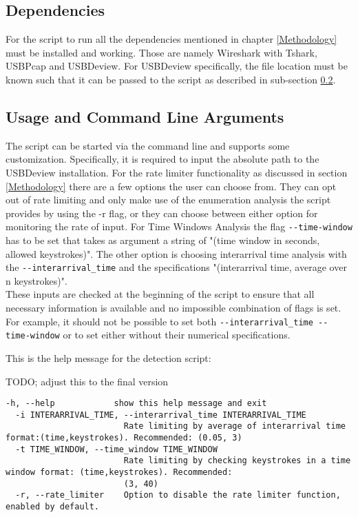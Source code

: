 \subsection{Dependencies}

For the script to run all the dependencies mentioned in chapter \ref{Methodology} must be installed and working. Those are namely Wireshark with Tshark, USBPcap and USBDeview. For USBDeview specifically, the file location must be known such that it can be passed to the script as described in sub-section \ref{Usage and Command Line Argumets}.



\subsection{Usage and Command Line Arguments} \label{Usage and Command Line Argumets}

The script can be started via the command line and supports some customization. Specifically, it is required to input the absolute path to the USBDeview installation. For the rate limiter functionality as discussed in section \ref{Methodology} there are a few options the user can choose from. They can opt out of rate limiting and only make use of the enumeration analysis the script provides by using the -r flag, or they can choose between either option for monitoring the rate of input. For Time Windows Analysis the flag \verb|--time-window| has to be set that takes as argument a string of "(time window in seconds, allowed keystrokes)". The other option is choosing interarrival time analysis with the \verb|--interarrival_time| and the specifications "(interarrival time, average over n keystrokes)". \\
These inputs are checked at the beginning of the script to ensure that all necessary information is available and no impossible combination of flags is set. For example, it should not be possible to set both 
\verb|--interarrival_time --time-window| or to set either without their numerical specifications. 

This is the help message for the detection script:

 TODO; adjust this to the final version
\begin{lstlisting}[caption={Defense Script Help Message },captionpos=b]
  -h, --help            show this help message and exit
  -i INTERARRIVAL_TIME, --interarrival_time INTERARRIVAL_TIME
                        Rate limiting by average of interarrival time format:(time,keystrokes). Recommended: (0.05, 3)
  -t TIME_WINDOW, --time_window TIME_WINDOW
                        Rate limiting by checking keystrokes in a time window format: (time,keystrokes). Recommended:
                        (3, 40)
  -r, --rate_limiter    Option to disable the rate limiter function, enabled by default.
\end{lstlisting}



